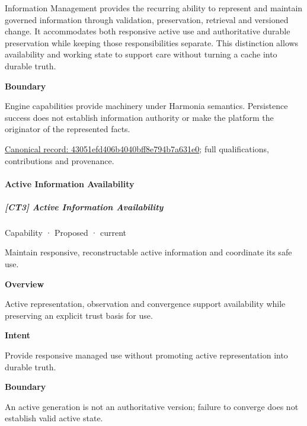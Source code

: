 Information Management provides the recurring ability to represent and maintain governed information through validation, preservation, retrieval and versioned change. It accommodates both responsive active use and authoritative durable preservation while keeping those responsibilities separate. This distinction allows availability and working state to support care without turning a cache into durable truth.



\textbf{Boundary}



Engine capabilities provide machinery under Harmonia semantics. Persistence success does not establish information authority or make the platform the originator of the represented facts.


{\footnotesize \href{../../../../continuum/strategy/capability/43051efd406b4040bff8e794b7a631e0.md}{Canonical record: 43051efd406b4040bff8e794b7a631e0}; full qualifications, contributions and provenance.}\par
\paragraph{Active Information Availability}

\subparagraph{[CT3] Active Information Availability}

\label{element:bb711f4d8fb74af2917869b9b05f7f84}
{\small Capability · Proposed · current}\par

Maintain responsive, reconstructable active information and coordinate its safe use.



\textbf{Overview}



Active representation, observation and convergence support availability while preserving an explicit trust basis for use.



\textbf{Intent}



Provide responsive managed use without promoting active representation into durable truth.



\textbf{Boundary}



An active generation is not an authoritative version; failure to converge does not establish valid active state.


